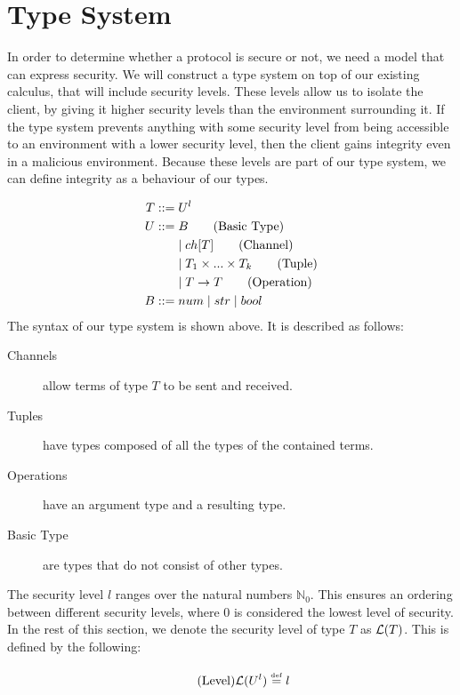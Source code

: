 \section{Type System}\label{ch:type-security}
In order to determine whether a protocol is secure or not, we need a model that can express security.
We will construct a type system on top of our existing calculus, that will include security levels.
These levels allow us to isolate the client, by giving it higher security levels than the environment surrounding it.
If the type system prevents anything with some security level from being accessible to an environment with a lower security level, then the client gains integrity even in a malicious environment.
Because these levels are part of our type system, we can define integrity as a behaviour of our types.

\begin{align*}
    T::=&\;U^l\\    	
    U::=&\;B \tag{Basic Type}\\
    &\mid ch[T] \tag{Channel}\\
    &\mid T_1 \times...\times T_k \tag{Tuple}\\
    &\mid T\rightarrow T \tag{Operation}\\
    B::=&\;num 
    \mid str
    \mid bool\\
\end{align*}
The syntax of our type system is shown above. It is described as follows:

\begin{description}
    \item[Channels] allow terms of type $T$ to be sent and received.
    \item[Tuples] have types composed of all the types of the contained terms.
    \item[Operations] have an argument type and a resulting type.
    \item[Basic Type] are types that do not consist of other types.
\end{description}

The security level $l$ ranges over the natural numbers $\mathbb{N}_0$.
This ensures an ordering between different security levels, where $0$ is considered the lowest level of security.
In the rest of this section, we denote the security level of type $T$ as $\mathcal{L}(T)$.
This is defined by the following:

\begin{align*}
    \tag{Level}\mathcal{L}(U^l)\overset{\underset{\mathrm{def}}{}}{=} l
\end{align*}

